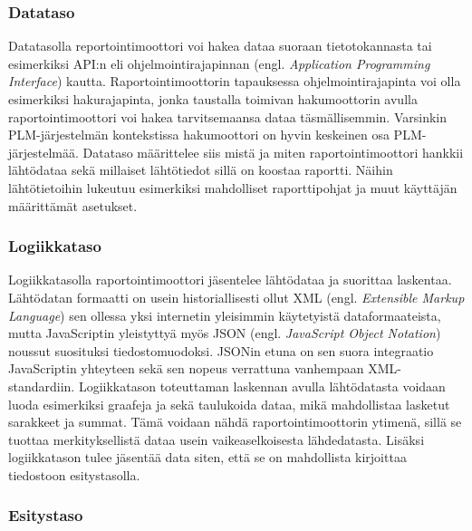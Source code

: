 \subsubsection{Datataso}

Datatasolla reportointimoottori voi hakea dataa suoraan tietotokannasta tai esimerkiksi API:n eli ohjelmointirajapinnan (engl. \textit{Application Programming Interface}) kautta. Raportointimoottorin tapauksessa ohjelmointirajapinta voi olla esimerkiksi hakurajapinta, jonka taustalla toimivan hakumoottorin avulla raportointimoottori voi hakea tarvitsemaansa dataa täsmällisemmin. Varsinkin PLM-järjestelmän kontekstissa hakumoottori on hyvin keskeinen osa PLM-järjestelmää. Datataso määrittelee siis mistä ja miten raportointimoottori hankkii lähtödataa sekä millaiset lähtötiedot sillä on koostaa raportti. \cite{he_design_2010} Näihin lähtötietoihin lukeutuu esimerkiksi mahdolliset raporttipohjat ja muut käyttäjän määrittämät asetukset.

\subsubsection{Logiikkataso}

Logiikkatasolla raportointimoottori jäsentelee lähtödataa ja suorittaa laskentaa. Lähtödatan formaatti on usein historiallisesti ollut XML (engl. \textit{Extensible Markup Language}) sen ollessa yksi internetin yleisimmin käytetyistä dataformaateista, mutta JavaScriptin yleistyttyä myös JSON (engl. \textit{JavaScript Object Notation}) noussut suosituksi tiedostomuodoksi. JSONin etuna on sen suora integraatio JavaScriptin yhteyteen sekä sen nopeus verrattuna vanhempaan XML-standardiin. \cite{nurseitov_comparison_nodate} Logiikkatason toteuttaman laskennan avulla lähtödatasta voidaan luoda esimerkiksi graafeja ja sekä taulukoida dataa, mikä mahdollistaa lasketut sarakkeet ja summat. Tämä voidaan nähdä raportointimoottorin ytimenä, sillä se tuottaa merkityksellistä dataa usein vaikeaselkoisesta lähdedatasta. \cite{he_design_2010} Lisäksi logiikkatason tulee jäsentää data siten, että se on mahdollista kirjoittaa tiedostoon esitystasolla.

\subsubsection{Esitystaso}

